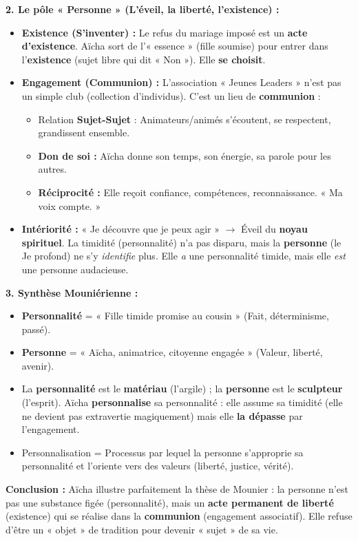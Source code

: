 \documentclass[11pt]{article}
\newcommand{\cle}[1]{{\popxbold\color{popdark}#1}}
\begin{document}
\begin{exoresolu}
\textbf{2. Le pôle « Personne » (L'éveil, la liberté, l'existence) :}
\begin{itemize}
    \item \textbf{Existence (S'inventer) :} Le refus du mariage imposé est un \textbf{acte d'existence}. Aïcha sort de l'« essence » (fille soumise) pour entrer dans l'\textbf{existence} (sujet libre qui dit « Non »). Elle \textbf{se choisit}.
    \item \textbf{Engagement (Communion) :} L'association « Jeunes Leaders » n'est pas un simple club (collection d'individus). C'est un lieu de \textbf{communion} :
    \begin{itemize}
        \item Relation \textbf{Sujet-Sujet} : Animateurs/animés s'écoutent, se respectent, grandissent ensemble.
        \item \textbf{Don de soi :} Aïcha donne son temps, son énergie, sa parole pour les autres.
        \item \textbf{Réciprocité :} Elle reçoit confiance, compétences, reconnaissance. « Ma voix compte. »
    \end{itemize}
    \item \textbf{Intériorité :} « Je découvre que je peux agir » $\to$ Éveil du \textbf{noyau spirituel}. La timidité (personnalité) n'a pas disparu, mais la \textbf{personne} (le Je profond) ne s'y \emph{identifie} plus. Elle \emph{a} une personnalité timide, mais elle \emph{est} une personne audacieuse.
\end{itemize}

\textbf{3. Synthèse Mouniérienne :}
\begin{itemize}
    \item \textbf{Personnalité} = « Fille timide promise au cousin » (Fait, déterminisme, passé).
    \item \textbf{Personne} = « Aïcha, animatrice, citoyenne engagée » (Valeur, liberté, avenir).
    \item La \textbf{personnalité} est le \textbf{matériau} (l'argile) ; la \textbf{personne} est le \textbf{sculpteur} (l'esprit). Aïcha \textbf{personnalise} sa personnalité : elle assume sa timidité (elle ne devient pas extravertie magiquement) mais elle \textbf{la dépasse} par l'engagement.
    \item \cle{Personnalisation} = Processus par lequel la personne s'approprie sa personnalité et l'oriente vers des valeurs (liberté, justice, vérité).
\end{itemize}
\textbf{Conclusion :} Aïcha illustre parfaitement la thèse de Mounier : la personne n'est pas une substance figée (personnalité), mais un \textbf{acte permanent de liberté} (existence) qui se réalise dans la \textbf{communion} (engagement associatif). Elle refuse d'être un « objet » de tradition pour devenir « sujet » de sa vie.
\end{exoresolu}
\end{document}
